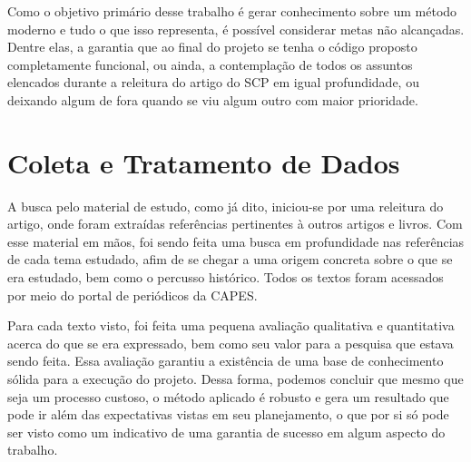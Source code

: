 Como o objetivo primário desse trabalho é gerar conhecimento sobre um método moderno e tudo o que isso representa, é possível considerar metas não alcançadas. Dentre elas, a garantia que ao final do projeto se tenha o código proposto completamente funcional, ou ainda, a contemplação de todos os assuntos elencados durante a releitura do artigo do SCP em igual profundidade, ou deixando algum de fora quando se viu algum outro com maior prioridade.

\section{Coleta e Tratamento de Dados}
\label{sec:titSecColDad}


\noindent
A busca pelo material de estudo, como já dito, iniciou-se por uma releitura do artigo, onde foram extraídas referências pertinentes à outros artigos e livros. Com esse material em mãos, foi sendo feita uma busca em profundidade nas referências de cada tema estudado, afim de se chegar a uma origem concreta sobre o que se era estudado, bem como o percusso histórico. Todos os textos foram acessados por meio do portal de periódicos da CAPES.

Para cada texto visto, foi feita uma pequena avaliação qualitativa e quantitativa acerca do que se era expressado, bem como seu valor para a pesquisa que estava sendo feita. Essa avaliação garantiu a existência de uma base de conhecimento sólida para a execução do projeto. Dessa forma, podemos concluir que mesmo que seja um processo custoso, o método aplicado é robusto e gera um resultado que pode ir além das expectativas vistas em seu planejamento, o que por si só pode ser visto como um indicativo de uma garantia de sucesso em algum aspecto do trabalho.